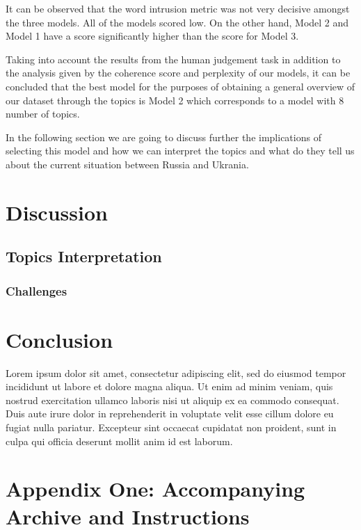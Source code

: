 \documentclass[twoside,12pt,a4paper]{article}
\begin{document}
\hfill \break
It can be observed that the word intrusion metric was not very decisive amongst the three models. All of the models scored low. On the other hand, Model 2 and Model 1 have a score significantly higher than the score for Model 3.

Taking into account the results from the human judgement task in addition to the analysis given by the coherence score and perplexity of our models, it can be concluded that the best model for the purposes of obtaining a general overview of our dataset through the topics is Model 2 which corresponds to a model with 8 number of topics.

In the following section we are going to discuss further the implications of selecting this model and how we can interpret the topics and what do they tell us about the current situation between Russia and Ukrania.

\clearpage
\section{Discussion}
\subsection{Topics Interpretation}


\subsubsection{Challenges}


\clearpage
\section{Conclusion}
Lorem ipsum dolor sit amet, consectetur adipiscing elit, sed do eiusmod tempor incididunt ut labore et dolore magna aliqua. Ut enim ad minim veniam, quis nostrud exercitation ullamco laboris nisi ut aliquip ex ea commodo consequat. Duis aute irure dolor in reprehenderit in voluptate velit esse cillum dolore eu fugiat nulla pariatur. Excepteur sint occaecat cupidatat non proident, sunt in culpa qui officia deserunt mollit anim id est laborum.

\clearpage
\lhead{}\rhead{}
{}



\clearpage
\section{Appendix One: Accompanying Archive and Instructions}
\label{section:appendix}
\end{document}
